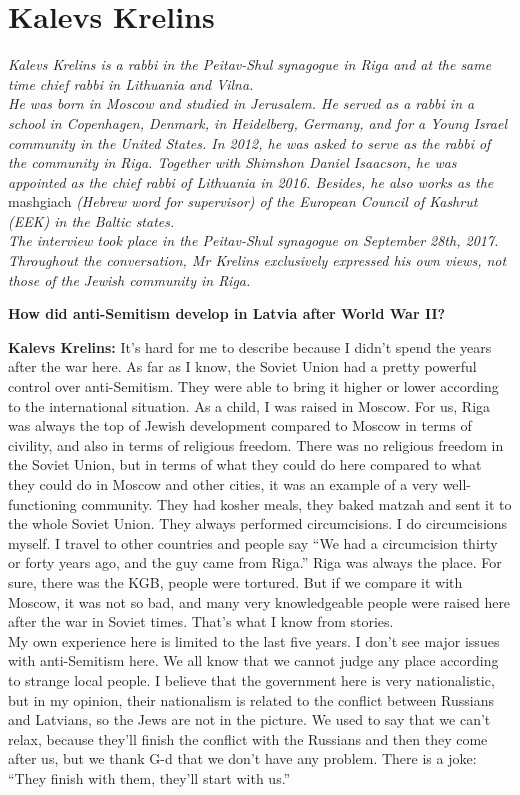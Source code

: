 \section{Kalevs Krelins}

\textit{Kalevs Krelins is a rabbi in the Peitav-Shul synagogue in Riga and at the same time chief rabbi in Lithuania and Vilna.\\
He was born in Moscow and studied in Jerusalem. He served as a rabbi in a school in Copenhagen, Denmark, in Heidelberg, Germany, and for a Young Israel community in the United States. In 2012, he was asked to serve as the rabbi of the community in Riga. Together with Shimshon Daniel Isaacson, he was appointed as the chief rabbi of Lithuania in 2016. Besides, he also works as the} mashgiach \textit{(Hebrew word for supervisor) of the European Council of Kashrut (EEK) in the Baltic states.\\
\sloppy
The interview took place in the Peitav-Shul synagogue on September 28th, 2017. Throughout the conversation, Mr Krelins exclusively expressed his own views, not those of the Jewish community in Riga.} \par 
\vspace*{2em}
\textbf{How did anti-Semitism develop in Latvia after World War II?}  

\textbf{Kalevs Krelins:} It’s hard for me to describe because I didn’t spend the years after the war here. As far as I know, the Soviet Union had a pretty powerful control over anti-Semitism. They were able to bring it higher or lower according to the international situation. As a child, I was raised in Moscow. For us, Riga was always the top of Jewish development compared to Moscow in terms of civility, and also in terms of religious freedom. There was no religious freedom in the Soviet Union, but in terms of what they could do here compared to what they could do in Moscow and other cities, it was an example of a very well-functioning community. They had kosher meals, they baked matzah and sent it to the whole Soviet Union. They always performed circumcisions. I do circumcisions myself. I travel to other countries and people say ``We had a circumcision thirty or forty years ago, and the guy came from Riga.'' Riga was always the place. For sure, there was the KGB, people were tortured. But if we compare it with Moscow, it was not so bad, and many very knowledgeable people were raised here after the war in Soviet times. That’s what I know from stories. \\
My own experience here is limited to the last five years. I don’t see major issues with anti-Semitism here.  We all know that we cannot judge any place according to strange local people. I believe that the government here is very nationalistic, but in my opinion, their nationalism is related to the conflict between Russians and Latvians, so the Jews are not in the picture. We used to say that we can’t relax, because they’ll finish the conflict with the Russians and then they come after us, but we thank G-d that we don’t have any problem. There is a joke: ``They finish with them, they’ll start with us.''  

